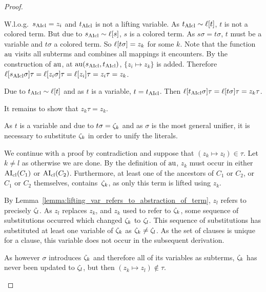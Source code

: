 \documentclass[,%
	paper=a4,%
	DIV14, %
	twoside=false,%
	liststotoc,
	bibtotoc,
	draft=false,%
	numbers=noendperiod
]{scrartcl}
\begin{document}
\begin{proof}
\begin{description}
\begin{compactitem}
			\item W.l.o.g.~$s_{\operatorname{AIcl}} = z_i$ and $t_{\operatorname{AIcl}}$ is not a lifting variable.
				As $t_{\operatorname{AIcl}} \sim \ell[t]$, $t$ is not a colored term.
				But due to $s_{\operatorname{AIcl}} \sim \ell[s]$, $s$ is a colored term.
				As $s\sigma = t\sigma$, $t$ must be a variable and $t\sigma$ a colored term.
				So $\ell[t\sigma] = z_k$ for some $k$.
				Note that the function $\operatorname{au}$ visits all subterms and combines all mappings it encounters.
				By the construction of $\operatorname{au}$, at $\operatorname{au}(s_{\operatorname{AIcl}}, t_{\operatorname{AIcl}})$, $\{ z_i \mapsto z_k \}$ is added.
				Therefore $\ell[s_{\operatorname{AIcl}}\sigma]\tau = \ell[z_i\sigma]\tau = \ell[z_i]\tau = z_i\tau = z_k$.

				Due to $t_{\operatorname{AIcl}} \sim \ell[t]$ and as $t$ is a variable, $t=t_{\operatorname{AIcl}}$.
				Then $\ell[t_{\operatorname{AIcl}}\sigma]\tau = \ell[t\sigma]\tau = z_k\tau$.

				It remains to show that $z_k\tau = z_k$.

				As $t$ is a variable and due to $t\sigma = \zeta_{k}$ and as $\sigma$ is the most general unifier, it is necessary to substitute $\zeta_{k}$ in order to unify the literals. 

				We continue with a proof by contradiction and suppose that $(z_k \mapsto z_l) \in \tau$. Let $k\neq l$ as otherwise we are done.
				By the definition of $\operatorname{au}$, $z_k$ must occur in either $\operatorname{AI}_\mathrm{cl}(C_1)$ or $\operatorname{AI}_\mathrm{cl}(C_2)$.
				 Furthermore, at least one of the ancestors of $C_1$ or $C_2$, or $C_1$ or $C_2$ themselves, contains~$\zeta_{k}$, as only this term is lifted using $z_k$.

				By Lemma~\ref{lemma:lifting_var_refers_to_abstraction_of_term}, $z_l$ refers to precisely $\zeta_{l}$. %
				As $z_l$ replaces $z_k$, and $z_k$ used to refer to $\zeta_{k}$,
				some sequence of substitutions occurred which changed $\zeta_{k}$ to $\zeta_{l}$.
				This sequence of substitutions has substituted at least one variable of $\zeta_{k}$ as $\zeta_{k}\neq\zeta_{l}$.
				As the set of clauses is unique for a clause, this variable does not occur in the subsequent derivation.

				As however $\sigma$ introduces $\zeta_{k}$ and therefore all of its variables as subterms, 
				$\zeta_{k}$ has never been updated to $\zeta_{l}$, but then $(z_k \mapsto z_l) \not\in \tau$.


\end{compactitem}
\end{description}
\end{proof}
\end{document}
